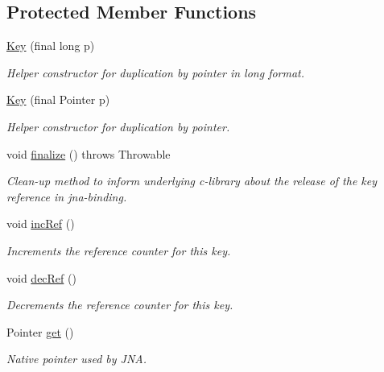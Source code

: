 \subsection*{Protected Member Functions}
\begin{DoxyCompactItemize}
\item 
\hyperlink{classorg_1_1libelektra_1_1Key_aeae5ed8b5eb0e9e4b7fce9ef9817fdfa}{Key} (final long p)
\begin{DoxyCompactList}\small\item\em Helper constructor for duplication by pointer in long format. \end{DoxyCompactList}\item 
\hyperlink{classorg_1_1libelektra_1_1Key_af40497ff85d172136ed1f274a50d37e7}{Key} (final Pointer p)
\begin{DoxyCompactList}\small\item\em Helper constructor for duplication by pointer. \end{DoxyCompactList}\item 
\mbox{\label{classorg_1_1libelektra_1_1Key_a1ae26aab95214a90a90bbcdeae828f7f}} 
void \hyperlink{classorg_1_1libelektra_1_1Key_a1ae26aab95214a90a90bbcdeae828f7f}{finalize} ()  throws Throwable 
\begin{DoxyCompactList}\small\item\em Clean-\/up method to inform underlying c-\/library about the release of the key reference in jna-\/binding. \end{DoxyCompactList}\item 
\mbox{\label{classorg_1_1libelektra_1_1Key_a83a2c9059ea97153731bcce1a68fc3b4}} 
void \hyperlink{classorg_1_1libelektra_1_1Key_a83a2c9059ea97153731bcce1a68fc3b4}{inc\+Ref} ()
\begin{DoxyCompactList}\small\item\em Increments the reference counter for this key. \end{DoxyCompactList}\item 
\mbox{\label{classorg_1_1libelektra_1_1Key_a62e237b332ecaa64790f9487edff0bdb}} 
void \hyperlink{classorg_1_1libelektra_1_1Key_a62e237b332ecaa64790f9487edff0bdb}{dec\+Ref} ()
\begin{DoxyCompactList}\small\item\em Decrements the reference counter for this key. \end{DoxyCompactList}\item 
Pointer \hyperlink{classorg_1_1libelektra_1_1Key_a3c65267ac3d24c3eae35db576414fe4f}{get} ()
\begin{DoxyCompactList}\small\item\em Native pointer used by J\+NA. \end{DoxyCompactList}\end{DoxyCompactItemize}
